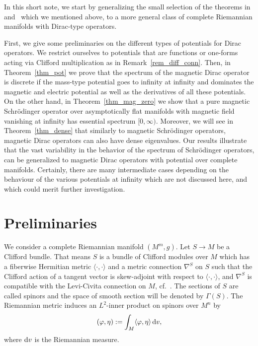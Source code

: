 \documentclass[pdftex]{sigma}
\numberwithin{equation}{section}
\begin{document}
In this short note, we start by generalizing the small selection of the theorems in~\cite{CFKS} and~\cite{Yamada} which we mentioned above, to a more general class of complete Riemannian manifolds with Dirac-type operators.

First, we give some preliminaries on the different types of potentials for Dirac operators. We restrict ourselves to potentials that are functions or one-forms acting via Clifford multiplication as in Remark~\ref{rem_diff_conn}. Then, in Theorem~\ref{thm_pot} we prove that the spectrum of the magnetic Dirac operator is discrete if the mass-type potential goes to infinity at infinity and dominates the magnetic and electric potential as well as the derivatives of all these potentials. On the other hand, in Theorem~\ref{thm_mag_zero} we show that a pure magnetic Schr\"odinger operator over asymptotically flat manifolds with magnetic field vanishing at infinity has essential spectrum $[0,\infty)$. Moreover, we will see in Theorem~\ref{thm_dense} that similarly to magnetic Schr\"odinger operators, magnetic Dirac operators can also have dense eigenvalues. Our results illustrate that the vast variability in the behavior of the spectrum of Schr\"odinger operators, can be generalized to magnetic Dirac operators with potential over complete manifolds. Certainly, there are many intermediate cases depending on the behaviour of the various potentials at infinity which are not discussed here, and which could merit further investigation.

\section{Preliminaries}
We consider a complete Riemannian manifold $(M^m,g)$. Let $S\to M$ be a Clifford bundle. That means $S$ is a bundle of Clifford modules over $M$ which has a fiberwise Hermitian metric $\langle\cdot,\cdot\rangle$ and a metric connection $\nabla^S$ on $S$ such that the Clifford action of a tangent vector is skew-adjoint with respect to $\langle\cdot,\cdot\rangle$, and $\nabla^S$ is compatible with the Levi-Civita connection on $M$, cf.\ \cite[Definition~3.4]{Roe}. The sections of $S$ are called spinors and the space of smooth section will be denoted by $\Gamma(S)$.	
The Riemannian metric induces an $L^2$-inner product on spinors over $M^n$ by
\[( \varphi, \eta ) := \int_M \langle\varphi, \eta\rangle\, {\rm d}v,\]
where ${\rm d}v$ is the Riemannian measure.
\end{document}
